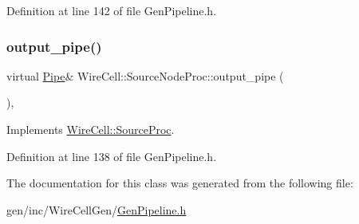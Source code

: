 Definition at line 142 of file Gen\+Pipeline.\+h.

\mbox{\label{class_wire_cell_1_1_source_node_proc_af23d814862a6fed4a20e37313255c179}} 
\subsubsection{\texorpdfstring{output\+\_\+pipe()}{output\_pipe()}}
{\footnotesize\ttfamily virtual \hyperlink{namespace_wire_cell_afce9bb01c731347c3d4c8ca9d4ed804f}{Pipe}\& Wire\+Cell\+::\+Source\+Node\+Proc\+::output\+\_\+pipe (\begin{DoxyParamCaption}{ }\end{DoxyParamCaption})\hspace{0.3cm}{\ttfamily [inline]}, {\ttfamily [virtual]}}



Implements \hyperlink{class_wire_cell_1_1_source_proc_a480b8ba5e80e9e7c6ffdf0b5d9fd0578}{Wire\+Cell\+::\+Source\+Proc}.



Definition at line 138 of file Gen\+Pipeline.\+h.



The documentation for this class was generated from the following file\+:\begin{DoxyCompactItemize}
\item 
gen/inc/\+Wire\+Cell\+Gen/\hyperlink{_gen_pipeline_8h}{Gen\+Pipeline.\+h}\end{DoxyCompactItemize}
